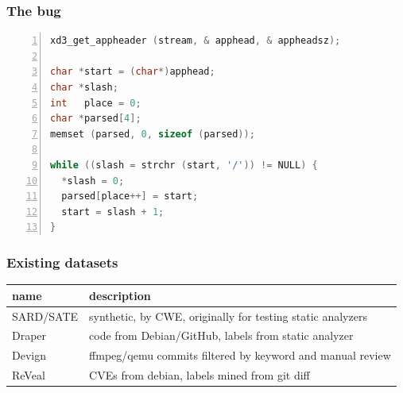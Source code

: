\documentclass[169,xcolor=table]{beamer}
\begin{document}
\begin{frame}[fragile]\frametitle{The bug}
  \begin{adjustwidth}{-0.5em}{-1.5em}
  \begin{lstlisting}[numbers=left, language=C, emph={parsed}, emphstyle={\alert}, emph={[2]place}, emphstyle={[2]\color{brown!60!black}}]
xd3_get_appheader (stream, & apphead, & appheadsz);

char *start = (char*)apphead;
char *slash;
int   place = 0;
char *parsed[4];
memset (parsed, 0, sizeof (parsed));

while ((slash = strchr (start, '/')) != NULL) {
  *slash = 0;
  parsed[place++] = start;
  start = slash + 1;
}
  \end{lstlisting}
  \end{adjustwidth}
\end{frame}

\begin{frame}\frametitle{Existing datasets}
  \begin{tabular}{p{11em}p{15em}}
    \toprule
    name & description \\
    \midrule
    SARD/SATE & synthetic, by CWE, originally for testing static analyzers \\
    Draper \cite{russell_automated_2018} & code from Debian/GitHub, labels from static analyzer \\
    Devign \cite{zhou_devign_2019} & ffmpeg/qemu commits filtered by keyword and manual review \\
    ReVeal \cite{chakraborty_deep_2020}& CVEs from debian, labels mined from git diff \\
    \bottomrule
  \end{tabular}
\end{frame}
\end{document}
